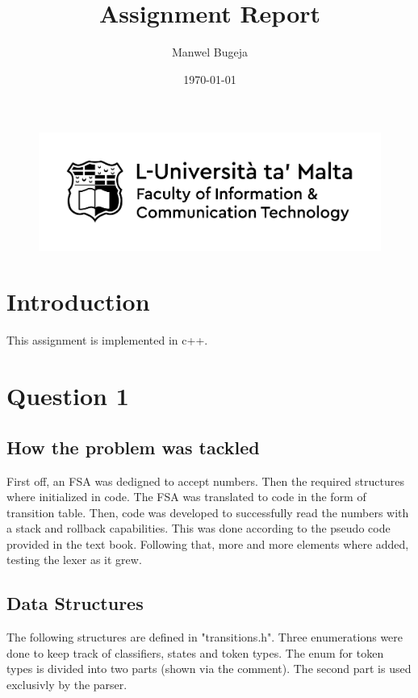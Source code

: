 \documentclass[a4paper, 12pt]{article}
\begin{document}
\begin{figure}
    \centering
    \includegraphics[width=1\textwidth]{Logo}
\end{figure}

\title{Assignment Report}
\author{Manwel Bugeja}
\date{\today}
\maketitle

\tableofcontents
\newpage

\section{Introduction}
This assignment is implemented in c++. 

\section{Question 1}
\subsection{How the problem was tackled} 
First off, an FSA was dedigned to accept numbers. Then the required structures where initialized in code.
The FSA was translated to code in the form of transition table. Then, code was developed to successfully read the 
numbers with a stack and rollback capabilities. This was done according to the pseudo code provided in the text book.
Following that, more and more elements where added, testing the lexer as it grew.

\subsection{Data Structures}
The following structures are defined in "transitions.h".
Three enumerations were done to keep track of classifiers, states and token types. The enum for token types is divided
into two parts (shown via the comment). The second part is used exclusivly by the parser.
\end{document}
